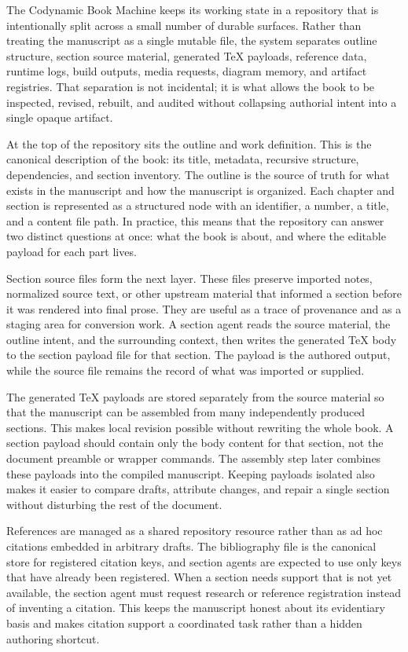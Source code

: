 The Codynamic Book Machine keeps its working state in a repository that is intentionally split across a small number of durable surfaces. Rather than treating the manuscript as a single mutable file, the system separates outline structure, section source material, generated \TeX{} payloads, reference data, runtime logs, build outputs, media requests, diagram memory, and artifact registries. That separation is not incidental; it is what allows the book to be inspected, revised, rebuilt, and audited without collapsing authorial intent into a single opaque artifact.

At the top of the repository sits the outline and work definition. This is the canonical description of the book: its title, metadata, recursive structure, dependencies, and section inventory. The outline is the source of truth for what exists in the manuscript and how the manuscript is organized. Each chapter and section is represented as a structured node with an identifier, a number, a title, and a content file path. In practice, this means that the repository can answer two distinct questions at once: what the book is about, and where the editable payload for each part lives.

Section source files form the next layer. These files preserve imported notes, normalized source text, or other upstream material that informed a section before it was rendered into final prose. They are useful as a trace of provenance and as a staging area for conversion work. A section agent reads the source material, the outline intent, and the surrounding context, then writes the generated \TeX{} body to the section payload file for that section. The payload is the authored output, while the source file remains the record of what was imported or supplied.

The generated \TeX{} payloads are stored separately from the source material so that the manuscript can be assembled from many independently produced sections. This makes local revision possible without rewriting the whole book. A section payload should contain only the body content for that section, not the document preamble or wrapper commands. The assembly step later combines these payloads into the compiled manuscript. Keeping payloads isolated also makes it easier to compare drafts, attribute changes, and repair a single section without disturbing the rest of the document.

References are managed as a shared repository resource rather than as ad hoc citations embedded in arbitrary drafts. The bibliography file is the canonical store for registered citation keys, and section agents are expected to use only keys that have already been registered. When a section needs support that is not yet available, the section agent must request research or reference registration instead of inventing a citation. This keeps the manuscript honest about its evidentiary basis and makes citation support a coordinated task rather than a hidden authoring shortcut.

